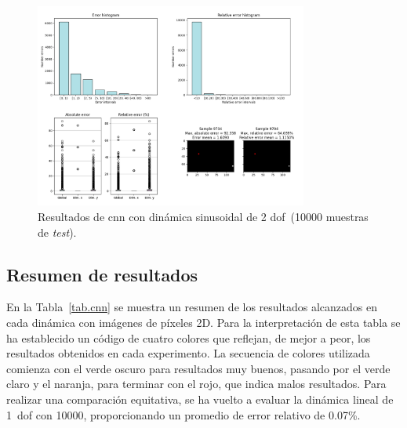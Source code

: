 \begin{figure}[H]
		\begin{center}
			\includegraphics[width=0.8\textwidth]{ figures/test_raw/NOREC/sin_var_100000.png}
			\caption{Resultados de \acrshort{cnn} con dinámica sinusoidal de 2 \acrshort{dof}~(10000 muestras de \textit{test}).}
			\label{fig.raw_norec_sin_var_100000}
		\end{center}
\end{figure}
\vspace{-10pt}

\subsection{Resumen de resultados}

En la Tabla~\ref{tab.cnn} se muestra un resumen de los resultados alcanzados en cada dinámica con imágenes de píxeles 2D. Para la interpretación de esta tabla se ha establecido un código de cuatro colores que reflejan, de mejor a peor, los resultados obtenidos en cada experimento. La secuencia de colores utilizada comienza con el verde oscuro para resultados muy buenos, pasando por el verde claro y el naranja, para terminar con el rojo, que indica malos resultados. Para  realizar una comparación equitativa, se ha vuelto a evaluar la dinámica lineal de 1~\acrshort{dof} con 10000, proporcionando un promedio de error relativo de 0.07\%. 

